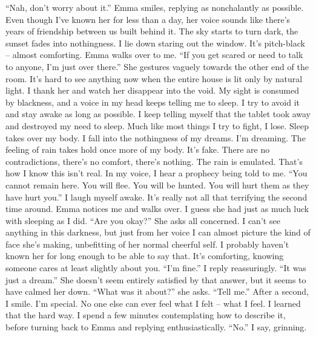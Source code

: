 \documentclass[openany, 12pt]{book}
\newcommand\tab[1][1cm]{\hspace*{#1}}
\begin{document}
\tab
``Nah, don’t worry about it.'' Emma smiles, replying as nonchalantly as possible. Even though I’ve known her for less than a day, her voice sounds like there’s years of friendship between us built behind it.\newline
\tab
The sky starts to turn dark, the sunset fades into nothingness. I lie down staring out the window. It’s pitch-black – almost comforting. Emma walks over to me. ``If you get scared or need to talk to anyone, I’m just over there.'' She gestures vaguely towards the other end of the room. It’s hard to see anything now when the entire house is lit only by natural light. I thank her and watch her disappear into the void. My sight is consumed by blackness, and a voice in my head keeps telling me to sleep. I try to avoid it and stay awake as long as possible. I keep telling myself that the tablet took away and destroyed my need to sleep. Much like most things I try to fight, I lose. Sleep takes over my body. I fall into the nothingness of my dreams.\newline
\tab
I’m dreaming. The feeling of rain takes hold once more of my body. It’s fake. There are no contradictions, there’s no comfort, there’s nothing. The rain is emulated. That’s how I know this isn’t real. In my voice, I hear a prophecy being told to me. ``You cannot remain here. You will flee. You will be hunted. You will hurt them as they have hurt you.'' I laugh myself awake. It’s really not all that terrifying the second time around. Emma notices me and walks over. I guess she had just as much luck with sleeping as I did.\newline
\tab
``Are you okay?'' She asks all concerned. I can’t see anything in this darkness, but just from her voice I can almost picture the kind of face she’s making, unbefitting of her normal cheerful self. I probably haven’t known her for long enough to be able to say that. It’s comforting, knowing someone cares at least slightly about you.\newline
\tab
``I’m fine.'' I reply reassuringly. ``It was just a dream.'' She doesn’t seem entirely satisfied by that answer, but it seems to have calmed her down. \newline
\tab
``What was it about?'' she asks. ``Tell me.'' After a second, I smile. I’m special. No one else can ever feel what I felt -- what I feel. I learned that the hard way. I spend a few minutes contemplating how to describe it, before turning back to Emma and replying enthusiastically.\newline
\tab
``No.'' I say, grinning.\newline
\end{document}
